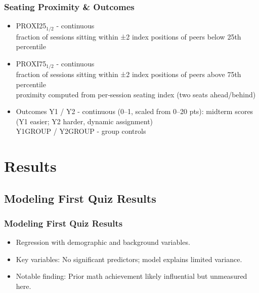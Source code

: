 \documentclass{beamer} %
\theoremstyle{definition}
\begin{document}
	\begin{frame}
		\frametitle{Seating Proximity \& Outcomes}
		\begin{itemize}
			\item PROXI25$_{1/2}$ - continuous  \\
			\subitem fraction of sessions sitting within ±2 index positions of peers below 25th percentile
			\item PROXI75$_{1/2}$ - continuous \\ 
			\subitem fraction of sessions sitting within ±2 index positions of peers above 75th percentile\\
			\subitem proximity computed from per‑session seating index (two seats ahead/behind)\\
			
			\item Outcomes
			\subitem Y1 / Y2 - continuous (0–1, scaled from 0–20 pts): midterm scores (Y1 easier; Y2 harder, dynamic assignment)\\
			\subitem Y1GROUP / Y2GROUP - group controls \\
		\end{itemize}
	\end{frame}
	
	
	\section{Results}
	
	\subsection{Modeling First Quiz Results}
	\begin{frame}
		\frametitle{Modeling First Quiz Results}
		\begin{itemize}
			\item Regression with demographic and background variables.
			\item Key variables: No significant predictors; model explains limited variance.
			\item Notable finding: Prior math achievement likely influential but unmeasured here.
		\end{itemize}
	\end{frame}
	
\end{document}
